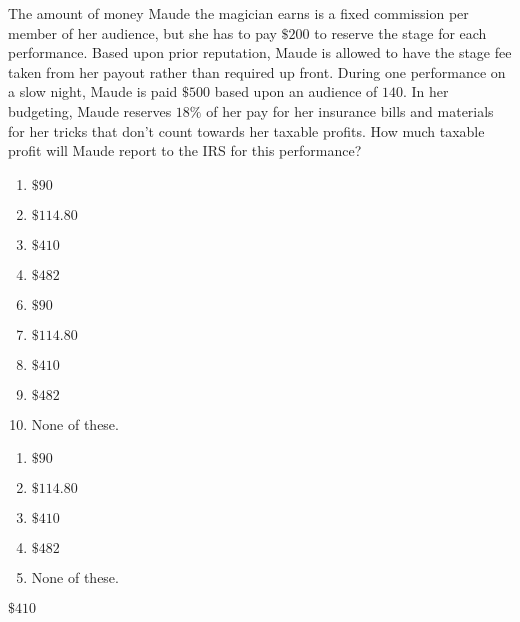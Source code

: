 
The amount of money Maude the magician earns is a fixed commission per member of her audience, but she has to pay $\$200$ to reserve the stage for each performance.  Based upon prior reputation, Maude is allowed to have the stage fee taken from her payout rather than required up front.  During one performance on a slow night, Maude is paid $\$500$ based upon an audience of $140$.  In her budgeting, Maude reserves $18\%$ of her pay for her insurance bills and materials for her tricks that don't count towards her taxable profits.  How much taxable profit will Maude report to the IRS for this performance?


\ifsat
	\begin{enumerate}[label=\Alph*)]
		\item $\$90 $ 
		\item $\$114.80 $ 
		\item $\$410 $ %
		\item $\$482 $
	\end{enumerate}
\else
\fi

\ifacteven
	\begin{enumerate}[label=\textbf{\Alph*.},itemsep=\fill,align=left]
		\setcounter{enumii}{5}
		\item $\$90 $ 
		\item $\$114.80 $ 
		\item $\$410 $ %
		\addtocounter{enumii}{1}
		\item $\$482 $
		\item None of these. 
	\end{enumerate}
\else
\fi

\ifactodd
	\begin{enumerate}[label=\textbf{\Alph*.},itemsep=\fill,align=left]
		\item $\$90 $ 
		\item $\$114.80 $ 
		\item $\$410 $ %
		\item $\$482 $
		\item None of these. 
	\end{enumerate}
\else
\fi

\ifgridin
 $\$410 $ %
		
\else
\fi

